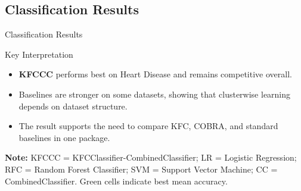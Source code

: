\subsection{Classification Results}
\begin{frame}[t]{Classification Results}
\scriptsize
\begin{table}
\centering
\renewcommand{\arraystretch}{1.16}
\setlength{\tabcolsep}{3.8pt}
\end{table}

\vspace{0.12cm}
\begin{block}{Key Interpretation}
\begin{itemize}\setlength\itemsep{0.06cm}
    \item \textbf{KFCCC} performs best on Heart Disease and remains competitive overall.
    \item Baselines are stronger on some datasets, showing that clusterwise learning depends on dataset structure.
    \item The result supports the need to compare KFC, COBRA, and standard baselines in one package.
\end{itemize}
\end{block}

{\scriptsize \textbf{Note:} KFCCC = KFCClassifier-CombinedClassifier; LR = Logistic Regression; RFC = Random Forest Classifier; SVM = Support Vector Machine; CC = CombinedClassifier. Green cells indicate best mean accuracy.}
\end{frame}

